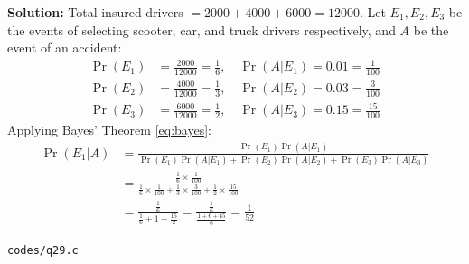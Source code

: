 \documentclass{article}
\begin{document}
\textbf{Solution:} Total insured drivers $= 2000 + 4000 + 6000 = 12000$.
Let $E_1, E_2, E_3$ be the events of selecting scooter, car, and truck drivers respectively, and $A$ be the event of an accident:
\begin{align}
\Pr(E_1) &= \frac{2000}{12000} = \frac{1}{6}, \quad \Pr(A|E_1) = 0.01 = \frac{1}{100} \\
\Pr(E_2) &= \frac{4000}{12000} = \frac{1}{3}, \quad \Pr(A|E_2) = 0.03 = \frac{3}{100} \\
\Pr(E_3) &= \frac{6000}{12000} = \frac{1}{2}, \quad \Pr(A|E_3) = 0.15 = \frac{15}{100}
\end{align}
Applying Bayes' Theorem \eqref{eq:bayes}:
\begin{align}
\Pr(E_1|A) &= \frac{\Pr(E_1)\Pr(A|E_1)}{\Pr(E_1)\Pr(A|E_1) + \Pr(E_2)\Pr(A|E_2) + \Pr(E_3)\Pr(A|E_3)} \\
&= \frac{\frac{1}{6} \times \frac{1}{100}}{\frac{1}{6} \times \frac{1}{100} + \frac{1}{3} \times \frac{3}{100} + \frac{1}{2} \times \frac{15}{100}} \\
&= \frac{\frac{1}{6}}{\frac{1}{6} + 1 + \frac{15}{2}} = \frac{\frac{1}{6}}{\frac{1 + 6 + 45}{6}} = \frac{1}{52}
\end{align}
\begin{tcolorbox}[colback=gray!10,colframe=black,width=\linewidth]
\texttt{codes/q29.c}
\end{tcolorbox}
\end{document}
